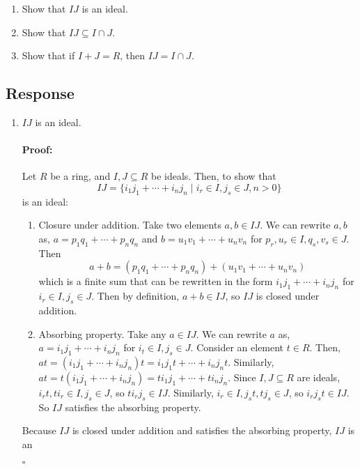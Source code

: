 \documentclass [12pt] {article}
\newenvironment{proof}{\paragraph{Proof:}}{\hfill$\square$}
\begin{document}
\begin{enumerate}
    \item Show that $IJ$ is an ideal. 
    \item Show that $IJ\subseteq I\cap J$. 
    \item Show that if $I+J=R$, then $IJ=I\cap J$.
\end{enumerate}
\subsection*{Response}
\begin{enumerate}
    \item $IJ$ is an ideal. 
        \vspace{-1em}
        \begin{proof}
            Let $R$ be a ring, and $I, J \subseteq R$ be ideals. Then, to show that 
            \[IJ = \{ i_1 j_1 + \cdots + i_n j_n \mid i_r \in I, j_s \in J, n>0 \}\] 
            is an ideal:
            \begin{enumerate}
                \item Closure under addition. Take two elements $a, b \in IJ$. We can rewrite $a, b$ 
                    as,
                    $a = p_1 q_1 + \cdots + p_n q_n$ and $b = u_1 v_1 + \cdots + u_n v_n$ for $p_r,
                    u_r \in I, q_s, v_s \in J$. Then
                    \[
                        a + b = (p_1 q_1 + \cdots + p_n q_n) + (u_1 v_1 + \cdots + u_n v_n)
                    \]
                    which is a finite sum that can be rewritten in the form 
                    $i_1 j_1 + \cdots + i_n j_n$ for $i_r \in I, j_s \in J$. Then by definition, 
                    $a + b \in IJ$, so $IJ$ is closed under addition.
                \item Absorbing property. Take any $a \in IJ$. We can
                    rewrite $a$ as, $a = i_1 j_1 + \cdots + i_n j_n$ for $i_t \in I, j_s \in J$. 
                    Consider an element $t \in R$. Then, 
                    $at = (i_1 j_1 + \cdots + i_n j_n) t = i_1 j_1 t + \cdots + i_n j_n t$. Similarly,
                    $at = t (i_1 j_1 + \cdots + i_n j_n) = t i_1 j_1 + \cdots + t i_n j_n$. Since 
                    $I, J \subseteq R$ are ideals, $i_r t, t i_r \in I, j_s \in J$, so
                    $t i_r j_s \in IJ$. Similarly, $i_r \in I, j_s t, t j_s \in J$, so
                    $i_r j_s t \in IJ$. So $IJ$ satisfies the absorbing property.
            \end{enumerate}
            Because $IJ$ is closed under addition and satisfies the absorbing property, $IJ$ is an 

\end{proof}
\end{enumerate}
\end{document}
